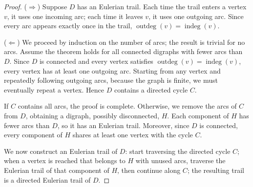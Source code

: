 \documentclass[11pt]{scrartcl}
\theoremstyle{plain}
\theoremstyle{remark}
\begin{document}
\begin{proof}
($\Rightarrow$) Suppose $D$ has an Eulerian trail. Each time the trail enters a vertex $v$, it uses one incoming arc; each time it leaves $v$, it uses one outgoing arc. Since every arc appears exactly once in the trail, $\operatorname{outdeg}(v) = \operatorname{indeg}(v)$.

\medskip
\noindent ($\Leftarrow$) We proceed by induction on the number of arcs; the result is trivial for no arcs. Assume the theorem holds for all connected digraphs with fewer arcs than $D$. Since $D$ is connected and every vertex satisfies $\operatorname{outdeg}(v) = \operatorname{indeg}(v)$, every vertex has at least one outgoing arc. Starting from any vertex and repeatedly following outgoing arcs, because the graph is finite, we must eventually repeat a vertex. Hence $D$ contains a directed cycle $C$.

If $C$ contains all arcs, the proof is complete. Otherwise, we remove the arcs of $C$ from $D$, obtaining a digraph, possibly disconnected, $H$. Each component of $H$ has fewer arcs than $D$, so it has an Eulerian trail. Moreover, since $D$ is connected, every component of $H$ shares at least one vertex with the cycle $C$.

We now construct an Eulerian trail of $D$: start traversing the directed cycle $C$; when a vertex is reached that belongs to $H$ with unused arcs, traverse the Eulerian trail of that component of $H$, then continue along $C$; the resulting trail is a directed Eulerian trail of $D$.
\end{proof}
\end{document}
